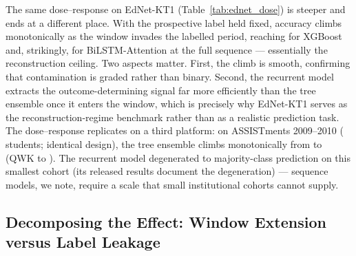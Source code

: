 \documentclass[sn-mathphys,Numbered]{sn-jnl}
\begin{document}
The same dose--response on EdNet-KT1 (Table~\ref{tab:ednet_dose}) is steeper and ends at a different place. With the prospective label held fixed, accuracy climbs monotonically as the window invades the labelled period, reaching \ednetDoseXGBAcc{} for XGBoost and, strikingly, \ednetDoseBiAcc{} for BiLSTM-Attention at the full sequence --- essentially the reconstruction ceiling. Two aspects matter. First, the climb is smooth, confirming that contamination is graded rather than binary. Second, the recurrent model extracts the outcome-determining signal far more efficiently than the tree ensemble once it enters the window, which is precisely why EdNet-KT1 serves as the reconstruction-regime benchmark rather than as a realistic prediction task. The dose--response replicates on a third platform: on ASSISTments 2009--2010 (\assistCohort{} students; identical design), the tree ensemble climbs monotonically from \assistAccFirst{} to \assistAccLast{} (QWK \assistQwkFirst{} to \assistQwkLast{}). The recurrent model degenerated to majority-class prediction on this smallest cohort (its released results document the degeneration) --- sequence models, we note, require a scale that small institutional cohorts cannot supply.



\subsection{Decomposing the Effect: Window Extension versus Label Leakage}\label{sec:res_decompose}
\end{document}
